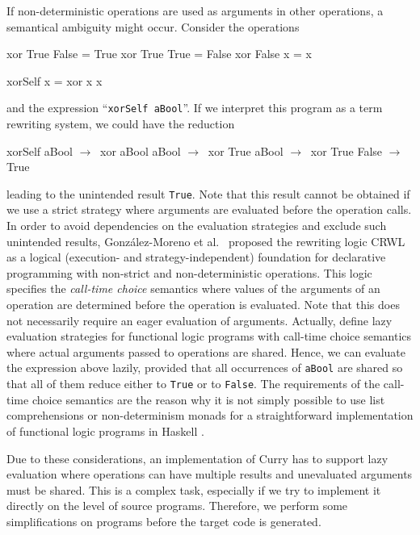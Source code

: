 \documentclass{llncs}
\newcommand{\code}[1]{\mbox{\small\texttt{#1}}}
\newcommand{\ccode}[1]{``\code{#1}''}
\begin{document}
If non-deterministic operations are used as arguments in other operations,
a semantical ambiguity might occur. Consider the operations
%
\begin{curry}
  xor True  False = True
  xor True  True  = False
  xor False x     = x

  xorSelf x = xor x x
\end{curry}
%
and the expression \ccode{xorSelf aBool}.
If we interpret this program as a term rewriting system,
we could have the reduction
\begin{haskell}
  xorSelf aBool  $\to~$  xor aBool aBool     $\to~$  xor True aBool
                 $\to~$  xor True False      $\to~$  True
\end{haskell}
leading to the unintended result \code{True}.
Note that this result cannot be obtained if we use a strict strategy
where arguments are evaluated before the operation calls.
In order to avoid dependencies on the evaluation strategies
and exclude such unintended results,
Gonz\'alez-Moreno et al.\ \cite{GonzalezEtAl99} proposed
the rewriting logic CRWL as a logical
(execution- and strategy-independent) foundation for declarative
programming with non-strict and non-deterministic operations.  This
logic specifies the \emph{call-time choice} semantics \cite{Hussmann92}
\label{ctc-semantics}
where values of the arguments of an operation are determined before the
operation is evaluated. Note that this does not necessarily require
an eager evaluation of arguments.
Actually, \cite{AlbertHanusHuchOliverVidal05,LopezRodriguezSanchez07}
define lazy evaluation strategies for functional logic programs
with call-time choice semantics where actual arguments passed to
operations are shared. Hence, we can evaluate the expression above
lazily, provided that all occurrences of \code{aBool}
are shared so that all of them reduce either to \code{True} or to \code{False}.
The requirements of the call-time choice semantics are the
reason why it is not simply possible to use list comprehensions
or non-determinism monads for a straightforward implementation
of functional logic programs in Haskell \cite{FischerKiselyovShan09}.

Due to these considerations, an implementation of Curry
has to support lazy evaluation where operations can have multiple results
and unevaluated arguments must be shared.
This is a complex task, especially if we try to implement it directly
on the level of source programs. Therefore, we perform some
simplifications on programs before the target code is generated.
\end{document}
